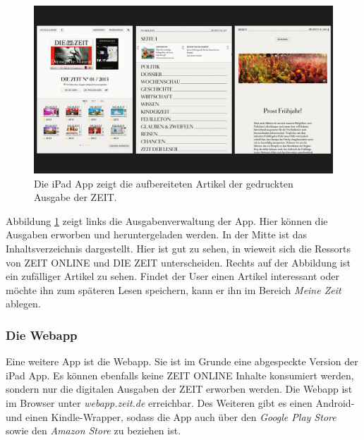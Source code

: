 \documentclass[12pt,a4paper,bibtotoc,abstracton]{scrartcl}
\begin{document}
\begin{figure}[h]	
	\centering
	\includegraphics[width=\textwidth]{Bilder/Screenshots/iPadApp/ipad1.png} 
	\caption[Die iPad App]{Die iPad App zeigt die aufbereiteten Artikel der gedruckten Ausgabe der ZEIT.}
	\label{fig:ipad1}
\end{figure}

Abbildung \ref{fig:ipad1} zeigt links die Ausgabenverwaltung der App. Hier können die Ausgaben erworben und heruntergeladen werden. In der Mitte ist das Inhaltsverzeichnis dargestellt. Hier ist gut zu sehen, in wieweit sich die Ressorts von ZEIT ONLINE und DIE ZEIT unterscheiden. Rechts auf der Abbildung ist ein zufälliger Artikel zu sehen. Findet der User einen Artikel interessant oder möchte ihn zum späteren Lesen speichern, kann er ihn im Bereich \textit{Meine Zeit} ablegen. 

\subsubsection{Die Webapp}
\label{subsubsec:webapp}
Eine weitere App ist die Webapp. Sie ist im Grunde eine abgespeckte Version der iPad App. Es können ebenfalls keine ZEIT ONLINE Inhalte konsumiert werden, sondern nur die digitalen Ausgaben der ZEIT erworben werden. Die Webapp ist im Browser unter \textit{webapp.zeit.de} erreichbar. Des Weiteren gibt es einen Android- und einen Kindle-Wrapper, sodass die App auch über den \textit{Google Play Store} sowie den \textit{Amazon Store} zu beziehen ist. 
\end{document}
